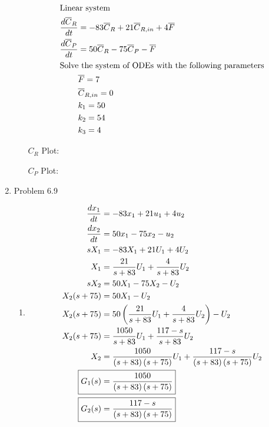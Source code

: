 \documentclass[12pt]{article}
\begin{document}
\begin{enumerate}
\begin{enumerate}
\begin{align*}
        \intertext{Linear system}
        \frac{d\overline{C}_R}{dt} &= -83 \overline{C}_R + 21 \overline{C}_{R,in} + 4 \overline{F} \\
        \frac{d\overline{C}_P}{dt} &= 50 \overline{C}_R - 75 \overline{C}_P - \overline{F} \\
        \intertext{Solve the system of ODEs with the following parameters}
        & \overline{F} = 7 \\
        & \overline{C}_{R,in} = 0 \\
        & k_1 = 50 \\
        & k_2 = 54 \\
        & k_3 = 4 \\
    \end{align*}

    $C_R$ Plot:

    \begin{center}
        
    \end{center}

    $C_P$ Plot:

    \begin{center}
        
    \end{center}
\end{enumerate}


\newpage
\item Problem 6.9
    \begin{enumerate}
        \item 
        \begin{align*}
            \frac{dx_1}{dt} &= -83x_1 + 21u_1 + 4u_2 \\  
            \frac{dx_2}{dt} &= 50x_1 - 75x_2 - u_2 \\
            sX_1 &= -83X_1 + 21U_1 + 4U_2 \\
            X_1 &= \frac{21}{s+83} U_1 + \frac{4}{s+83} U_2 \\
            sX_2 &= 50X_1 - 75X_2 - U_2 \\
            X_2 (s+75) &= 50X_1 - U_2 \\
            X_2 (s+75) &= 50\left(\frac{21}{s+83} U_1 + \frac{4}{s+83} U_2\right) - U_2 \\
            X_2 (s+75) &= \frac{1050}{s+83} U_1 + \frac{117-s}{s+83} U_2 \\
            X_2 &= \frac{1050}{\left(s+83\right)\left(s+75\right)} U_1 + \frac{117-s}{\left(s+83\right)\left(s+75\right)} U_2 \\
            \Aboxed{G_1(s) &= \frac{1050}{\left(s+83\right)\left(s+75\right)}} \\
            \Aboxed{G_2(s) &= \frac{117-s}{\left(s+83\right)\left(s+75\right)}}
        \end{align*}


\end{enumerate}
\end{enumerate}
\end{document}
